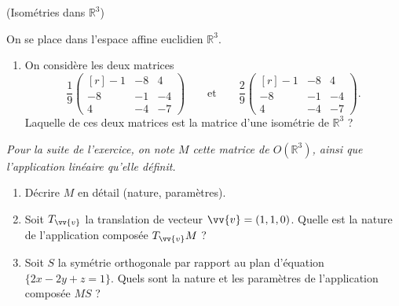 \documentclass[a4paper,12pt,reqno]{amsart}
\begin{document}
\begin{exo} (Isométries dans $\mathbb{R}^{3}$)

  On se place dans l'espace affine euclidien $\mathbb{R}^{3}$.

  \begin{enumerate}
    \item On considère les deux matrices
    \[
      \renewcommand{\arraystretch}{.77}
      \frac{1}{9}
      \begin{pmatrix*}[r]
        -1 & -8 &  4 \\
        -8 & -1 & -4 \\
         4 & -4 & -7
      \end{pmatrix*}
      \qquad\text{et}\qquad
      \frac{2}{9}
      \begin{pmatrix*}[r]
        -1 & -8 &  4 \\
        -8 & -1 & -4 \\
         4 & -4 & -7
      \end{pmatrix*}
    .\]
    Laquelle de ces deux matrices est la matrice d'une isométrie de $\mathbb{R}^{3}$ ?
  \end{enumerate}

  \emph{Pour la suite de l'exercice, on note $M$ cette matrice de $O(\mathbb{R}^{3})$, ainsi que l'application linéaire qu'elle définit.}

  \begin{enumerate}[resume]

    \item Décrire $M$ en détail (nature, paramètres).

    \item Soit $T_{\vv{v}}$ la translation de vecteur $\vv{v} = (1,1,0)$. Quelle est la nature de l'application composée $T_{\vv{v}}M$ ?

    \item Soit $S$ la symétrie orthogonale par rapport au plan d'équation $\{2x-2y+z=1\}$. Quels sont la nature et les paramètres de l'application composée $MS$ ?
  \end{enumerate}
\end{exo}
\end{document}
